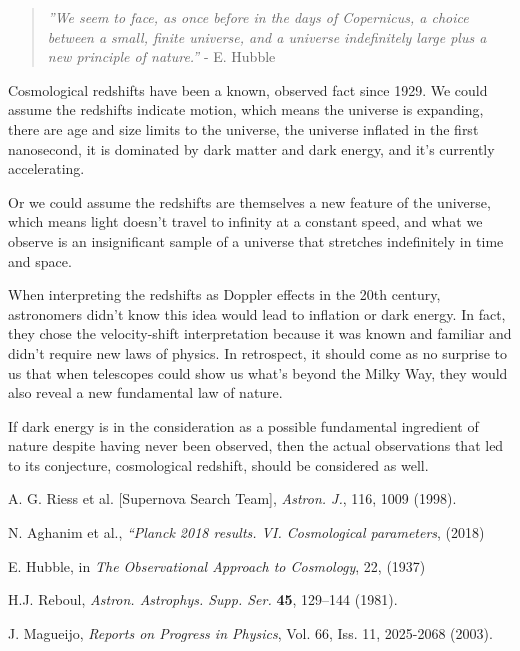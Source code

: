 \documentclass{ws-mpla}
\begin{document}
\begin{quote}
\emph{''We seem to face, as once before in the days of Copernicus, a choice between a small, finite universe, 
and a universe indefinitely large plus a new principle of nature.''} - E. Hubble
\end{quote}


Cosmological redshifts have been a known, observed fact since 1929.
We could assume the redshifts indicate motion, which means 
the universe is expanding, 
there are age and size limits to the universe, 
the universe inflated in the first nanosecond, 
it is dominated by dark matter and dark energy, 
and it's currently accelerating.

Or we could assume the redshifts are themselves a new feature of the universe, which means
light doesn't travel to infinity at a constant speed,  
and what we observe is an insignificant sample of a universe that stretches indefinitely in time and space. 


When interpreting the redshifts as Doppler effects in the 20th century, astronomers didn't know this idea would lead to inflation or dark energy. In fact, they chose the velocity-shift interpretation because it was known and familiar and didn't require new laws of physics.
In retrospect, it should come as no surprise to us that when telescopes could show us what's beyond the Milky Way, they would also reveal a new fundamental law of nature.

If dark energy is in the consideration as a possible fundamental ingredient of nature despite having never been observed, then the actual observations that led to its conjecture, cosmological redshift, should be considered as well.


\begin{thebibliography}{0}


 A. G. Riess et al. [Supernova Search Team], {\it  Astron. J.}, 116, 1009 (1998).

 N. Aghanim et al., {\it“Planck 2018 results. VI. Cosmological parameters},
(2018)

 E. Hubble, in {\it The Observational Approach to Cosmology}, 22, (1937)

 H.J. Reboul, {\it Astron. Astrophys. Supp. Ser.} {\bf 45},
129--144 (1981).

 J. Magueijo, {\it Reports on Progress in Physics}, Vol. 66, Iss. 11, 2025-2068 (2003).

\end{thebibliography}
\end{document}
